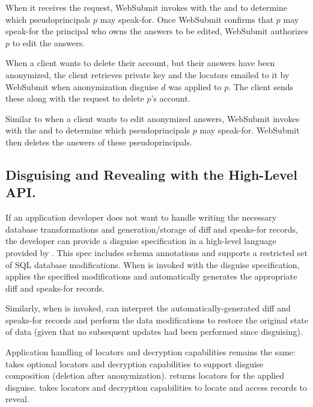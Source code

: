 When it receives the request, WebSubmit invokes  with the  and
 to determine which pseudoprincipals $p$ may speak-for.  Once WebSubmit confirms that $p$
may speak-for the principal who owns the answers to be edited, WebSubmit authorizes $p$ to edit the
answers.

 When a client wants to delete their account, but their
answers have been anonymized, the client retrieves private key  and the locators 
emailed to it by WebSubmit when anonymization disguise $d$ was applied to $p$. The client sends
these along with the request to delete $p$'s account.

Similar to when a client wants to edit anonymized answers, WebSubmit invokes 
with the  and  to determine which pseudoprincipals $p$ may speak-for.  WebSubmit
then deletes the answers of these pseudoprincipals.

\subsection{Disguising and Revealing with the High-Level API.}
\label{s:api-high} If an application developer does not want to handle writing the necessary
database transformations and generation/storage of diff and speaks-for records, the developer can
provide a disguise specification in a high-level language provided by \sys. This spec includes
schema annotations and supports a restricted set of SQL database modifications. When
 is invoked with the disguise specification, \sys applies the specified
modifications and automatically generates the appropriate diff and speaks-for records.

Similarly, when  is invoked, \sys can interpret the automatically-generated diff
and speaks-for records and perform the data modifications to restore the original state of data
(given that no subsequent updates had been performed since disguising).

Application handling of locators and decryption capabilities remains the same: 
takes optional locators and decryption capabilities to support disguise composition (\eg deletion
after anonymization).  returns locators for the applied disguise.
 takes locators and decryption capabilities to locate and access records to
reveal.
